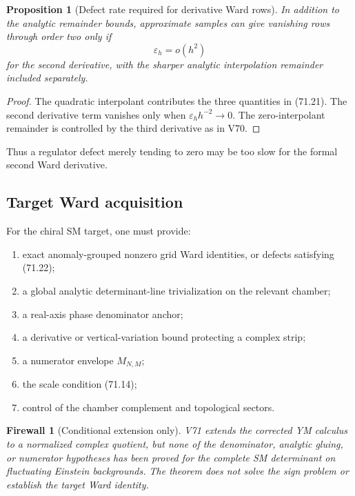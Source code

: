 \documentclass[11pt]{article}
\newtheorem{proposition}[theorem]{Proposition}
\newtheorem{firewall}[theorem]{Firewall}
\begin{document}
\begin{proposition}[Defect rate required for derivative Ward rows]
\label{prop:v11v71-defect}
In addition to the analytic remainder bounds, approximate samples can
give vanishing rows through order two only if
\[
                         \varepsilon_h=o(h^2)                 \tag{71.22}
\]
for the second derivative, with the sharper analytic interpolation
remainder included separately.
\end{proposition}

\begin{proof}
The quadratic interpolant contributes the three quantities in
(71.21).  The second derivative term vanishes only when
\(\varepsilon_hh^{-2}\to0\).  The zero-interpolant remainder is
controlled by the third derivative as in V70.
\end{proof}

Thus a regulator defect merely tending to zero may be too slow for the
formal second Ward derivative.

\subsection{Target Ward acquisition}

\begin{ledger}
\label{led:v11v71-data}
For the chiral SM target, one must provide:
\begin{enumerate}
\item exact anomaly-grouped nonzero grid Ward identities, or defects
satisfying (71.22);
\item a global analytic determinant-line trivialization on the
relevant chamber;
\item a real-axis phase denominator anchor;
\item a derivative or vertical-variation bound protecting a complex
strip;
\item a numerator envelope \(M_{N,M}\);
\item the scale condition (71.14);
\item control of the chamber complement and topological sectors.
\end{enumerate}
\end{ledger}

\begin{firewall}[Conditional extension only]
\label{fire:v11v71-boundary}
V71 extends the corrected YM calculus to a normalized complex quotient,
but none of the denominator, analytic gluing, or numerator hypotheses
has been proved for the complete SM determinant on fluctuating
Einstein backgrounds.  The theorem does not solve the sign problem or
establish the target Ward identity.
\end{firewall}
\end{document}
